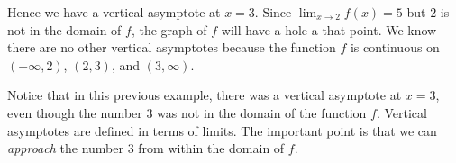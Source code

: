 \documentclass{ximera}
\begin{document}
\begin{example}
\begin{explanation}
\begin{image}
\end{image}
Hence we have a vertical asymptote at $x=3$. Since $\displaystyle \lim_{x\to 2} f(x) = 5$ but $2$ is not in the domain of $f$, the graph of $f$ will have a hole a that point. We know there are no other vertical asymptotes because the function $f$ is continuous on $(-\infty, 2)$, $(2, 3)$, and $(3,\infty)$.
\end{explanation}
\end{example}

Notice that in this previous example, there was a vertical asymptote at $x=3$, even though the number $3$ was not in the domain of the function $f$. 
Vertical asymptotes are defined in terms of limits. The important point is that we can \emph{approach} the number $3$ from within the domain of $f$.
\end{document}
